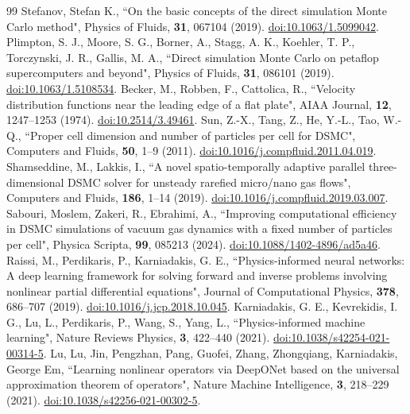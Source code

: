 \documentclass[aip,pof,preprint,floatfix,amsmath,amssymb]{revtex4-2}
\begin{document}
\begin{thebibliography}{99}
 Stefanov, Stefan K., ``On the basic concepts of the direct simulation Monte Carlo method", Physics of Fluids, \textbf{31}, 067104 (2019). \href{https://doi.org/10.1063/1.5099042}{doi:10.1063/1.5099042}.
 Plimpton, S. J., Moore, S. G., Borner, A., Stagg, A. K., Koehler, T. P., Torczynski, J. R., Gallis, M. A., ``Direct simulation Monte Carlo on petaflop supercomputers and beyond", Physics of Fluids, \textbf{31}, 086101 (2019). \href{https://doi.org/10.1063/1.5108534}{doi:10.1063/1.5108534}.
 Becker, M., Robben, F., Cattolica, R., ``Velocity distribution functions near the leading edge of a flat plate", AIAA Journal, \textbf{12}, 1247--1253 (1974). \href{https://doi.org/10.2514/3.49461}{doi:10.2514/3.49461}.
 Sun, Z.-X., Tang, Z., He, Y.-L., Tao, W.-Q., ``Proper cell dimension and number of particles per cell for DSMC", Computers and Fluids, \textbf{50}, 1--9 (2011). \href{https://doi.org/10.1016/j.compfluid.2011.04.019}{doi:10.1016/j.compfluid.2011.04.019}.
 Shamseddine, M., Lakkis, I., ``A novel spatio-temporally adaptive parallel three-dimensional DSMC solver for unsteady rarefied micro/nano gas flows", Computers and Fluids, \textbf{186}, 1--14 (2019). \href{https://doi.org/10.1016/j.compfluid.2019.03.007}{doi:10.1016/j.compfluid.2019.03.007}.
 Sabouri, Moslem, Zakeri, R., Ebrahimi, A., ``Improving computational efficiency in DSMC simulations of vacuum gas dynamics with a fixed number of particles per cell", Physica Scripta, \textbf{99}, 085213 (2024). \href{https://doi.org/10.1088/1402-4896/ad5a46}{doi:10.1088/1402-4896/ad5a46}.
 Raissi, M., Perdikaris, P., Karniadakis, G. E., ``Physics-informed neural networks: A deep learning framework for solving forward and inverse problems involving nonlinear partial differential equations", Journal of Computational Physics, \textbf{378}, 686--707 (2019). \href{https://doi.org/10.1016/j.jcp.2018.10.045}{doi:10.1016/j.jcp.2018.10.045}.
 Karniadakis, G. E., Kevrekidis, I. G., Lu, L., Perdikaris, P., Wang, S., Yang, L., ``Physics-informed machine learning", Nature Reviews Physics, \textbf{3}, 422--440 (2021). \href{https://doi.org/10.1038/s42254-021-00314-5}{doi:10.1038/s42254-021-00314-5}.
 Lu, Lu, Jin, Pengzhan, Pang, Guofei, Zhang, Zhongqiang, Karniadakis, George Em, ``Learning nonlinear operators via DeepONet based on the universal approximation theorem of operators", Nature Machine Intelligence, \textbf{3}, 218--229 (2021). \href{https://doi.org/10.1038/s42256-021-00302-5}{doi:10.1038/s42256-021-00302-5}.

\end{thebibliography}
\end{document}
